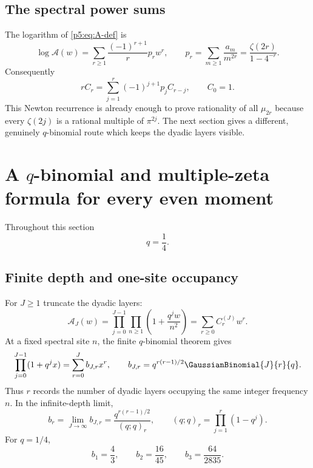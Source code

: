 \documentclass[11pt]{article}
\numberwithin{equation}{section}
\theoremstyle{definition}
\theoremstyle{remark}
\begin{document}
\subsection{The spectral power sums}

The logarithm of \cref{p5:eq:A-def} is
\begin{equation}\label{p5:eq:logA-power}
 \log\mathcal A(w)
 =\sum_{r\ge1}\frac{(-1)^{r+1}}r p_rw^r,
 \qquad
 p_r=\sum_{m\ge1}\frac{a_m}{m^{2r}}
 =\frac{\zeta(2r)}{1-4^{-r}}.
\end{equation}
Consequently
\begin{equation}\label{p5:eq:C-recurrence}
 rC_r=\sum_{j=1}^{r}(-1)^{j+1}p_jC_{r-j},\qquad C_0=1.
\end{equation}
This Newton recurrence is already enough to prove rationality of all
$\mu_{2r}$ because every $\zeta(2j)$ is a rational multiple of $\pi^{2j}$.
The next section gives a different, genuinely $q$-binomial route which keeps
the dyadic layers visible.

\section{A $q$-binomial and multiple-zeta formula for every even moment}

Throughout this section
\begin{equation}\label{p5:eq:q-def}
 q=\frac14.
\end{equation}

\subsection{Finite depth and one-site occupancy}

For $J\ge1$ truncate the dyadic layers:
\begin{equation}\label{p5:eq:AJ-def}
 \mathcal A_J(w)=\prod_{j=0}^{J-1}\prod_{n\ge1}
 \left(1+\frac{q^jw}{n^2}\right)
 =\sum_{r\ge0}C_r^{(J)}w^r.
\end{equation}
At a fixed spectral site $n$, the finite $q$-binomial theorem gives
\begin{equation}\label{p5:eq:finite-qbinom}
 \prod_{j=0}^{J-1}(1+q^jx)
 =\sum_{r=0}^{J}b_{J,r}x^r,
 \qquad
 b_{J,r}=q^{r(r-1)/2}\GaussianBinomial{J}{r}{q}.
\end{equation}
Thus $r$ records the number of dyadic layers occupying the same integer
frequency $n$.  In the infinite-depth limit,
\begin{equation}\label{p5:eq:b-infty}
 b_r=\lim_{J\to\infty}b_{J,r}
 =\frac{q^{r(r-1)/2}}{(q;q)_r},
 \qquad (q;q)_r=\prod_{j=1}^{r}(1-q^j).
\end{equation}
For $q=1/4$,
\begin{equation}\label{p5:eq:b-first}
 b_1=\frac43,\qquad b_2=\frac{16}{45},\qquad
 b_3=\frac{64}{2835}.
\end{equation}
\end{document}
